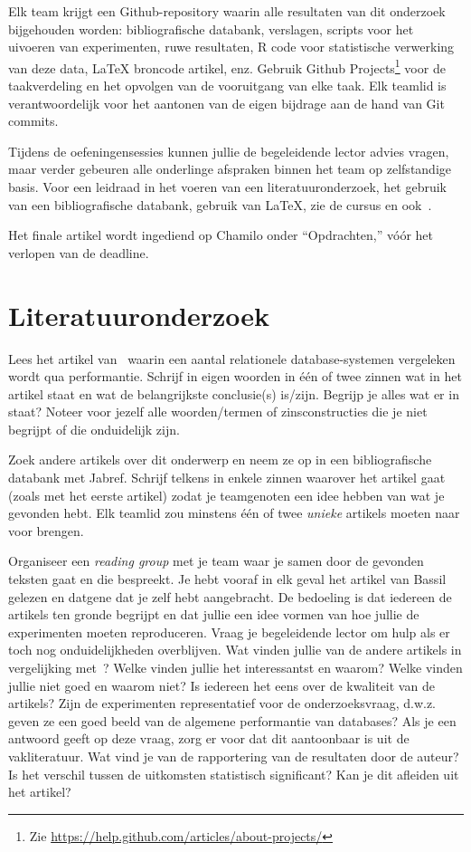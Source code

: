 \documentclass[fleqn,10pt]{voorstel}
\begin{document}
Elk team krijgt een Github-repository waarin alle resultaten van dit onderzoek bijgehouden worden: bibliografische databank, verslagen, scripts voor het uivoeren van experimenten, ruwe resultaten, R code voor statistische verwerking van deze data, {\LaTeX} broncode artikel, enz. Gebruik Github Projects\footnote{Zie \url{https://help.github.com/articles/about-projects/}} voor de taakverdeling en het opvolgen van de vooruitgang van elke taak. Elk teamlid is verantwoordelijk voor het aantonen van de eigen bijdrage aan de hand van Git commits. 

Tijdens de oefeningensessies kunnen jullie de begeleidende lector advies vragen, maar verder gebeuren alle onderlinge afspraken binnen het team op zelfstandige basis. Voor een leidraad in het voeren van een literatuuronderzoek, het gebruik van een bibliografische databank, gebruik van \LaTeX{}, zie de cursus en ook~\textcite{VanVreckem2017}.

Het finale artikel wordt ingediend op Chamilo onder ``Opdrachten,'' vóór het verlopen van de deadline.


\section{Literatuuronderzoek}

Lees het artikel van~\textcite{Bassil2012} waarin een aantal relationele database-systemen vergeleken wordt qua performantie. Schrijf in eigen woorden in één of twee zinnen wat in het artikel staat en wat de belangrijkste conclusie(s) is/zijn. Begrijp je alles wat er in staat? Noteer voor jezelf alle woorden/termen of zinsconstructies die je niet begrijpt of die onduidelijk zijn.

Zoek andere artikels over dit onderwerp en neem ze op in een bibliografische databank met Jabref. Schrijf telkens in enkele zinnen waarover het artikel gaat (zoals met het eerste artikel) zodat je teamgenoten een idee hebben van wat je gevonden hebt. Elk teamlid zou minstens één of twee \emph{unieke} artikels moeten naar voor brengen.

Organiseer een \emph{reading group} met je team waar je samen door de gevonden teksten gaat en die bespreekt. Je hebt vooraf in elk geval het artikel van Bassil gelezen en datgene dat je zelf hebt aangebracht. De bedoeling is dat iedereen de artikels ten gronde begrijpt en dat jullie een idee vormen van hoe jullie de experimenten moeten reproduceren. Vraag je begeleidende lector om hulp als er toch nog onduidelijkheden overblijven. Wat vinden jullie van de andere artikels in vergelijking met~\textcite{Bassil2012}? Welke vinden jullie het interessantst en waarom? Welke vinden jullie niet goed en waarom niet? Is iedereen het eens over de kwaliteit van de artikels? Zijn de experimenten representatief voor de onderzoeksvraag, d.w.z. geven ze een goed beeld van de algemene performantie van databases? Als je een antwoord geeft op deze vraag, zorg er voor dat dit aantoonbaar is uit de vakliteratuur. Wat vind je van de rapportering van de resultaten door de auteur? Is het verschil tussen de uitkomsten statistisch significant? Kan je dit afleiden uit het artikel?
\end{document}
